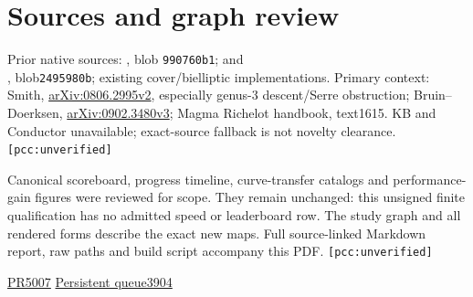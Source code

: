 \documentclass[10pt,a4paper]{article}
\newcommand{\uv}{\texttt{[pcc:unverified]}}
\begin{document}
\section{Sources and graph review}
\begin{flushleft}
Prior native sources: , blob
\texttt{990760b1}; and\\
, blob\texttt{2495980b}; existing cover/bielliptic implementations. Primary context:
Smith, \href{https://arxiv.org/abs/0806.2995}{arXiv:0806.2995v2}, especially
genus-$3$ descent/Serre obstruction; Bruin--Doerksen,
\href{https://arxiv.org/abs/0902.3480}{arXiv:0902.3480v3}; Magma Richelot
handbook, text1615. KB and Conductor unavailable; exact-source fallback is
not novelty clearance. \uv
\end{flushleft}

Canonical scoreboard, progress timeline, curve-transfer catalogs and
performance-gain figures were reviewed for scope. They remain unchanged:
this unsigned finite qualification has no admitted speed or leaderboard
row. The study graph and all rendered forms describe the exact new maps.
Full source-linked Markdown report, raw paths and build script accompany
this PDF. \uv

\href{https://github.com/isogeny-labs/crypto/pull/5007}{PR5007}\quad
\href{https://github.com/isogeny-labs/crypto/issues/3904}{Persistent queue3904}
\end{document}
